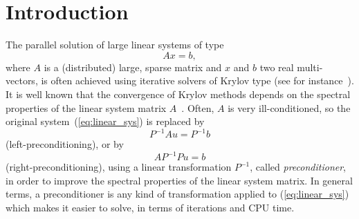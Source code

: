 % 
% 
% 
%  
%  
% 

\section{Introduction}
\label{chap:introduction}

The parallel solution of large linear systems of type
\begin{equation}
\label{eq:linear_sys}
A {x} = {b},
\end{equation}
where $A$ is a (distributed) large, sparse matrix and $x$ and $b$ two real
multi-vectors, is often achieved using iterative solvers of Krylov type (see for
instance~\cite{barret93templates}).
It is well known that the convergence of Krylov methods depends on 
the spectral properties of the linear system matrix
$A$~\cite{axelsson94iterative,saad96iterative,QSS}. Often, $A$ is very
ill-conditioned, so the
original system~(\ref{eq:linear_sys}) is replaced by
\[
P^{-1} A{u} = P^{-1} {b}
\]
(left-preconditioning), or by
\[
A P^{-1} P {u} = {b}
\]
(right-preconditioning), using a linear transformation $P^{-1}$,
called {\sl preconditioner}, in order to improve the spectral properties of
the linear system matrix. In general terms, a preconditioner is any
kind of transformation applied to (\ref{eq:linear_sys}) which makes it
easier to solve, in terms of iterations and CPU time.

